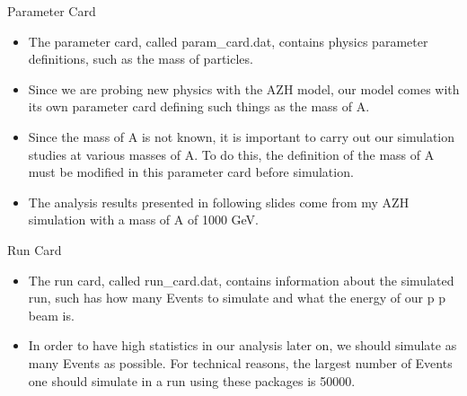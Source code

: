 \documentclass{beamer}
\begin{document}
	\begin{frame}{Parameter Card}
		\begin{itemize}
\item<1->The parameter card, called param\_card.dat, contains physics parameter definitions, such as the mass of particles.

\bigskip

\item<1->Since we are probing new physics with the AZH model, our model comes with its own parameter card defining such things as the mass of A.

\bigskip

\item<1->Since the mass of A is not known, it is important to carry out our simulation studies at various masses of A. To do this, the definition of the mass of A must be modified in this parameter card before simulation.

\bigskip

\item<1->The analysis results presented in following slides come from my AZH simulation with a mass of A of 1000 GeV.
		\end{itemize}
	\end{frame}
	\begin{frame}{Run Card}
		\begin{itemize}
\item<1->The run card, called run\_card.dat, contains information about the simulated run, such has how many Events to simulate and what the energy of our p p beam is.

\bigskip

\item<1->In order to have high statistics in our analysis later on, we should simulate as many Events as possible. For technical reasons, the largest number of Events one should simulate in a run using these packages is 50000. 
		\end{itemize}
	\end{frame}
\end{document}
